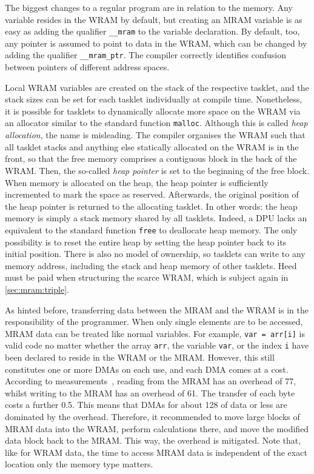 The biggest changes to a regular \langC{} program are in relation to the memory.
Any variable resides in the \ac{WRAM} by default, but creating an \ac{MRAM} variable is as easy as adding the qualifier \lstinline|__mram| to the variable declaration.
By default, too, any pointer is assumed to point to data in the \ac{WRAM}, which can be changed by adding the qualifier \lstinline|__mram_ptr|.
The compiler correctly identifies confusion between pointers of different address spaces.

Local \ac{WRAM} variables are created on the stack of the respective tasklet, and the stack sizes can be set for each tasklet individually at compile time.
Nonetheless, it is possible for tasklets to dynamically allocate more space on the \ac{WRAM} via an allocator similar to the standard \langC{} function \lstinline|malloc|.
Although this is called \emph{heap allocation}, the name is misleading.
The compiler organises the \ac{WRAM} such that all tasklet stacks and anything else statically allocated on the \ac{WRAM} is in the front, so that the free memory comprises a contiguous block in the back of the \ac{WRAM}.
Then, the so-called \emph{heap pointer} is set to the beginning of the free block.
When memory is allocated on the heap, the heap pointer is sufficiently incremented to mark the space as reserved.
Afterwards, the original position of the heap pointer is returned to the allocating tasklet.
In other words:
the heap memory is simply a stack memory shared by all tasklets.
Indeed, a \ac{DPU} lacks an equivalent to the standard \langC{} function \lstinline|free| to deallocate heap memory.
The only possibility is to reset the entire heap by setting the heap pointer back to its initial position.
There is also no model of ownership, so tasklets can write to any memory address, including the stack and heap memory of other tasklets.
Heed must be paid when structuring the scarce \ac{WRAM}, which is subject again in \cref{sec:mram:triple}.

As hinted before, transferring data between the \ac{MRAM} and the \ac{WRAM} is in the responsibility of the programmer.
When only single elements are to be accessed, \ac{MRAM} data can be treated like normal variables.
For example, \lstinline|var = arr[i]| is valid code no matter whether the array \lstinline|arr|, the variable \lstinline|var|, or the index \lstinline|i| have been declared to reside in the WRAM or the MRAM.
However, this still constitutes one or more \acp{DMA} on each use, and each \ac{DMA} comes at a cost.
According to measurements~\cite{mutlu2022Benchmarking}, reading from the \ac{MRAM} has an overhead of \qty{77}{\cycles}, whilst writing to the \ac{MRAM} has an overhead of \qty{61}{\cycles}.
The transfer of each byte costs a further \qty{0.5}{\cycles}.
This means that \acp{DMA} for about \qty{128}{\byte} of data or less are dominated by the overhead.
Therefore, it recommended to move large blocks of \ac{MRAM} data into the \ac{WRAM}, perform calculations there, and move the modified data block back to the \ac{MRAM}.
This way, the overhead is mitigated.
Note that, like for \ac{WRAM} data, the time to access \ac{MRAM} data is independent of the exact location \Dash only the memory type matters.

